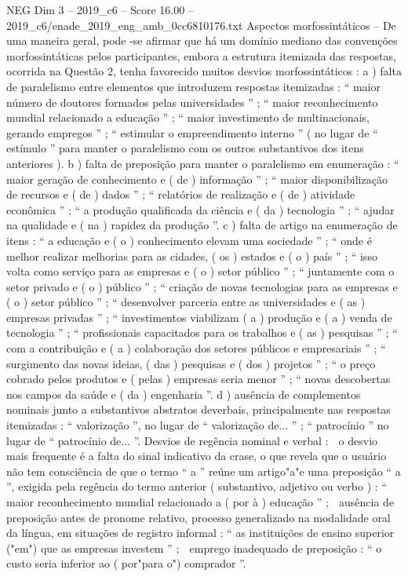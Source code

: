 \begin{textsample}{NEG Dim 3 – 2019\_c6 – Score 16.00 – 2019\_c6/enade\_2019\_eng\_amb\_0cc6810176.txt}
Aspectos morfossintáticos – De uma maneira geral, pode -se afirmar que há um domínio mediano das convenções morfossintáticas pelos participantes, embora a estrutura itemizada das respostas, ocorrida na Questão 2, tenha favorecido muitos desvios morfossintáticos : a ) falta de paralelismo entre elementos que introduzem respostas itemizadas : “ maior número de doutores formados pelas universidades ” ; “ maior reconhecimento mundial relacionado a educação ” ; “ maior investimento de multinacionais, gerando empregos ” ; “ estimular o empreendimento interno ” ( no lugar de “ estímulo ” para manter o paralelismo com os outros substantivos dos itens anteriores ). b ) falta de preposição para manter o paralelismo em enumeração : “ maior geração de conhecimento e ( de ) informação ” ; “ maior disponibilização de recursos e ( de ) dados ” ; “ relatórios de realização e ( de ) atividade econômica ” ; “ a produção qualificada da ciência e ( da ) tecnologia ” ; “ ajudar na qualidade e ( na ) rapidez da produção ”. c ) falta de artigo na enumeração de itens : “ a educação e ( o ) conhecimento elevam uma sociedade ” ; “ onde é melhor realizar melhorias para as cidades, ( os ) estados e ( o ) país ” ; “ isso volta como serviço para as empresas e ( o ) setor público ” ; “ juntamente com o setor privado e ( o ) público ” ; “ criação de novas tecnologias para as empresas e ( o ) setor público ” ; “ desenvolver parceria entre as universidades e ( as ) empresas privadas ” ; “ investimentos viabilizam ( a ) produção e ( a ) venda de tecnologia ” ; “ profissionais capacitados para os trabalhos e ( as ) pesquisas ” ; “ com a contribuição e ( a ) colaboração dos setores públicos e empresariais ” ; “ surgimento das novas ideias, ( das ) pesquisas e ( dos ) projetos ” ; “ o preço cobrado pelos produtos e ( pelas ) empresas seria menor ” ; “ novas descobertas nos campos da saúde e ( da ) engenharia ”. d ) ausência de complementos nominais junto a substantivos abstratos deverbais, principalmente nas respostas itemizadas : “ valorização ”, no lugar de “ valorização de... ” ; “ patrocínio ” no lugar de “ patrocínio de... ”.
Desvios de regência nominal e verbal :  o desvio mais frequente é a falta do sinal indicativo da crase, o que revela que o usuário não tem consciência de que o termo “ a ” reúne um artigo"a"e uma preposição “ a ”, exigida pela regência do termo anterior ( substantivo, adjetivo ou verbo ) : “ maior reconhecimento mundial relacionado a ( por à ) educação ” ;  ausência de preposição antes de pronome relativo, processo generalizado na modalidade oral da língua, em situações de registro informal : “ as instituições de ensino superior ("em") que as empresas investem ” ;  emprego inadequado de preposição : “ o custo seria inferior ao ( por"para o") comprador ”.

\end{textsample}
